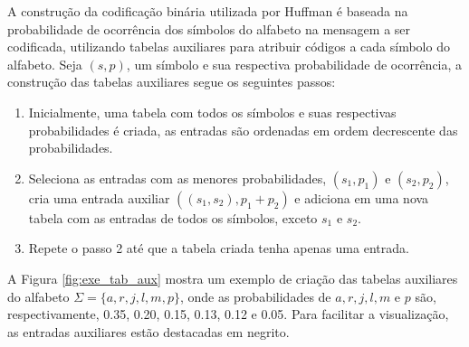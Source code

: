 A construção da codificação binária utilizada por Huffman é baseada na probabilidade de ocorrência dos símbolos do alfabeto na mensagem a ser codificada, utilizando tabelas auxiliares para atribuir códigos a cada símbolo do alfabeto. Seja $(s, p)$, um símbolo e sua respectiva probabilidade de ocorrência, a construção das tabelas auxiliares segue os seguintes passos:

\begin{enumerate}
    \item Inicialmente, uma tabela com todos os símbolos e suas respectivas probabilidades é criada, as entradas são ordenadas em ordem decrescente das probabilidades.
    \item Seleciona as entradas com as menores probabilidades, $(s_1, p_1)$ e $(s_2, p_2)$, cria uma entrada auxiliar $((s_1, s_2), p_1+p_2)$ e adiciona em uma nova tabela com as entradas de todos os símbolos, exceto $s_1$ e $s_2$.
    \item Repete o passo 2 até que a tabela criada tenha apenas uma entrada.
\end{enumerate}

A Figura \ref{fig:exe_tab_aux} mostra um exemplo de criação das tabelas auxiliares do alfabeto $\Sigma = \{a, r, j, l, m, p\}$, onde as probabilidades de $a, r, j, l, m$ e $p$ são, respectivamente, 0.35, 0.20, 0.15, 0.13, 0.12 e 0.05. Para facilitar a visualização, as entradas auxiliares estão destacadas em negrito.

